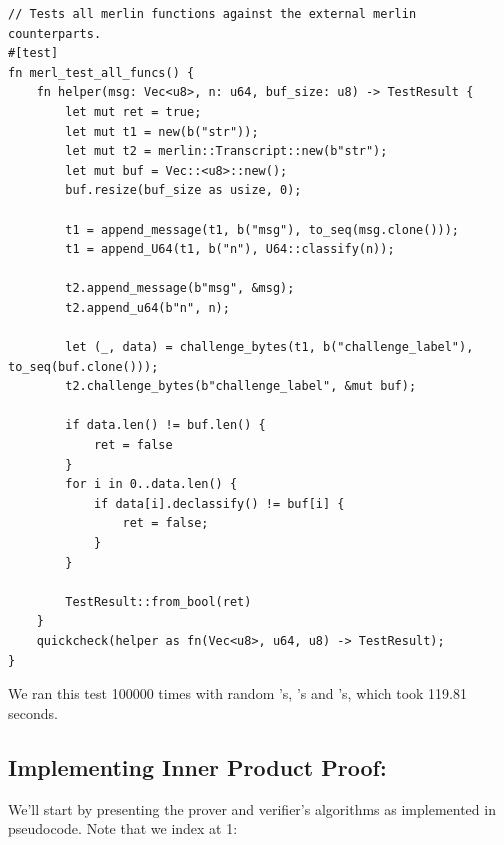 \documentclass{article}
\newcommand*\ttvar[1]{\texttt{\expandafter\dottvar\detokenize{#1}\relax}}
\newcommand*\dottvar[1]{\ifx\relax#1\else
  \expandafter\ifx\string_#1\string_\allowbreak\else#1\fi
  \expandafter\dottvar\fi}
\begin{document}
\begin{lstlisting}
// Tests all merlin functions against the external merlin counterparts.
#[test]
fn merl_test_all_funcs() {
	fn helper(msg: Vec<u8>, n: u64, buf_size: u8) -> TestResult {
		let mut ret = true;
		let mut t1 = new(b("str"));
		let mut t2 = merlin::Transcript::new(b"str");
		let mut buf = Vec::<u8>::new();
		buf.resize(buf_size as usize, 0);

		t1 = append_message(t1, b("msg"), to_seq(msg.clone()));
		t1 = append_U64(t1, b("n"), U64::classify(n));

		t2.append_message(b"msg", &msg);
		t2.append_u64(b"n", n);

		let (_, data) = challenge_bytes(t1, b("challenge_label"), to_seq(buf.clone()));
		t2.challenge_bytes(b"challenge_label", &mut buf);

		if data.len() != buf.len() {
			ret = false
		}
		for i in 0..data.len() {
			if data[i].declassify() != buf[i] {
				ret = false;
			}
		}

		TestResult::from_bool(ret)
	}
	quickcheck(helper as fn(Vec<u8>, u64, u8) -> TestResult);
}
\end{lstlisting}

We ran this test 100000 times with random \ttvar{msg}'s, \ttvar{n}'s
and \ttvar{buf_size}'s, which took 119.81 seconds.

\subsection{Implementing Inner Product Proof:} \label{implementing-inner-product-proof}

We'll start by presenting the prover and verifier's algorithms as
implemented in pseudocode. Note that we index at 1:
\end{document}
